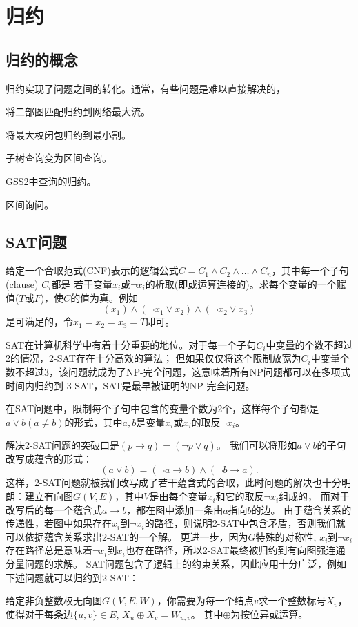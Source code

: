 \chapter{归约}


\section{归约的概念}

归约实现了问题之间的转化。通常，有些问题是难以直接解决的，

将二部图匹配归约到网络最大流。

将最大权闭包归约到最小割。

子树查询变为区间查询。

GSS2中查询的归约。

区间询问。

\section{SAT问题}

\begin{prob}
 给定一个合取范式(CNF)表示的逻辑公式$C = C_1 \land C_2 \land \ldots \land C_n$，其中每一个子句(clause) $C_i$都是
 若干变量$x_i$或$\neg x_i$的析取(即或运算连接的)。求每个变量的一个赋值($T$或$F$)，使$C$的值为真。例如
 $$(x_1)\land(\neg x_1 \lor x_2)\land(\neg x_2 \lor x_3)$$
 是可满足的，令$x_1=x_2=x_3=T$即可。
\end{prob}

SAT在计算机科学中有着十分重要的地位。对于每一个子句$C_i$中变量的个数不超过2的情况，2-SAT存在十分高效的算法；
但如果仅仅将这个限制放宽为$C_i$中变量个数不超过3，该问题就成为了NP-完全问题，这意味着所有NP问题都可以在多项式时间内归约到
3-SAT，SAT是最早被证明的NP-完全问题。

\begin{prob}[2-SAT]
 在SAT问题中，限制每个子句中包含的变量个数为2个，这样每个子句都是$a\lor b (a \neq b)$的形式，其中$a, b$是变量$x_i$或$x_i$的取反$\neg x_i$。
\end{prob}

解决2-SAT问题的突破口是$(p\to q) = (\neg p \lor q)$。
我们可以将形如$a\lor b$的子句改写成蕴含的形式：$$(a\lor b) = (\neg a \to b) \land (\neg b \to a).$$
这样，2-SAT问题就被我们改写成了若干蕴含式的合取，此时问题的解决也十分明朗：建立有向图$G(V,E)$，其中$V$是由每个变量$x_i$和它的取反$\neg x_i$组成的，
而对于改写后的每一个蕴含式$a\to b$，都在图中添加一条由$a$指向$b$的边。
由于蕴含关系的传递性，若图中如果存在$x_i$到$\neg x_i$的路径，则说明2-SAT中包含矛盾，否则我们就可以依据蕴含关系求出2-SAT的一个解。
更进一步，因为$G$特殊的对称性, $x_i$到$\neg x_i$存在路径总是意味着$\neg x_i$到$x_i$也存在路径，所以2-SAT最终被归约到有向图强连通分量问题的求解。
SAT问题包含了逻辑上的约束关系，因此应用十分广泛，例如下述问题就可以归约到2-SAT：
\begin{prob}
 给定非负整数权无向图$G(V, E, W)$，你需要为每一个结点$v$求一个整数标号$X_v$，使得对于每条边$\{u, v\}\in E$, $X_u \oplus X_v = W_{u,v}$。
 其中$\oplus$为按位异或运算。
\end{prob}

